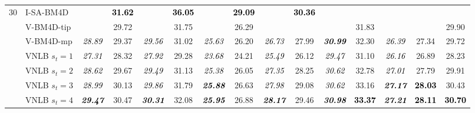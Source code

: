 \documentclass[10pt, a4paper]{article}
\newcommand{\bsic}[1]{\textcolor{black}{\textit{#1}}}
\newcommand{\Bsic}[1]{\textcolor{black}{\textbf{\textit{#1}}}}
\newcommand{\Best}[1]{\textbf{\textcolor{black}{#1}}}
\begin{document}
\begin{landscape}
\begin{table}[htp!]
\begin{center}
{\begin{tabular}{ c | l |c c | c c | c c | c c | c c | c c | c }
%
			\multirow{1}{*}{$30$}
			                      & I-SA-BM4D            & \bsic{     } & \Best{31.62} & \bsic{     } & \Best{36.05}  & \bsic{     } & \Best{29.09}  & \bsic{     } & \Best{30.36} &              &               &              &              &              \\
			                      & V-BM4D-tip           & \bsic{     } &       29.72  &              &       31.75   & \bsic{     } &       26.29   &              &              &              &       31.83   &              &              &       29.90  \\
			                      & V-BM4D-mp            & \bsic{28.89} &       29.37  & \bsic{29.56} &       31.02   & \bsic{25.63} &       26.20   & \bsic{26.73} &       27.99  & \Bsic{30.99} &       32.30   & \bsic{26.39} &       27.34  &       29.72  \\
			                      & VNLB   $s_t = 1$     & \bsic{27.31} &       28.32  & \bsic{27.92} &       29.28   & \bsic{23.68} &       24.21   & \bsic{25.49} &       26.12  & \bsic{29.47} &       31.10   & \bsic{26.16} &       26.89  &       28.23  \\
			                      & VNLB   $s_t = 2$     & \bsic{28.62} &       29.67  & \bsic{29.49} &       31.13   & \bsic{25.38} &       26.05   & \bsic{27.35} &       28.25  & \bsic{30.62} &       32.78   & \bsic{27.01} &       27.79  &       29.91  \\
			                      & VNLB   $s_t = 3$     & \bsic{28.99} &       30.13  & \bsic{29.86} &       31.79   & \Bsic{25.88} &       26.63   & \bsic{27.98} &       29.08  & \bsic{30.62} &       33.16   & \Bsic{27.17} & \Best{28.03} &       30.43  \\
			                      & VNLB   $s_t = 4$     & \Bsic{29.47} &       30.47  & \Bsic{30.31} &       32.08   & \Bsic{25.95} &       26.88   & \Bsic{28.17} &       29.46  & \Bsic{30.98} & \Best{33.37}  & \Bsic{27.21} & \Best{28.11} & \Best{30.70} \\\hline

\end{tabular}}
\end{center}
\end{table}
\end{landscape}
\end{document}
